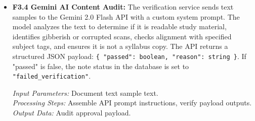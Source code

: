 \documentclass[12,Times new Roman,a4paper]{report}
\begin{document}
\begin{itemize}
    \textit{Input Parameters:} Sentences selection. \\
    \textit{Processing Steps:} Perform Axios GET requests, parse retrieved HTML bodies, evaluate set similarity metrics. \\
    \textit{Output Data:} Web sources Jaccard index.
    
    \item \textbf{F3.4 Gemini AI Content Audit:} The verification service sends text samples to the Gemini 2.0 Flash API with a custom system prompt. The model analyzes the text to determine if it is readable study material, identifies gibberish or corrupted scans, checks alignment with specified subject tags, and ensures it is not a syllabus copy. The API returns a structured JSON payload: \texttt{\{ "passed": boolean, "reason": string \}}. If "passed" is false, the note status in the database is set to \texttt{"failed\_verification"}.
    
    \textit{Input Parameters:} Document text sample text. \\
    \textit{Processing Steps:} Assemble API prompt instructions, verify payload outputs. \\
    \textit{Output Data:} Audit approval payload.
\end{itemize}
\end{document}
